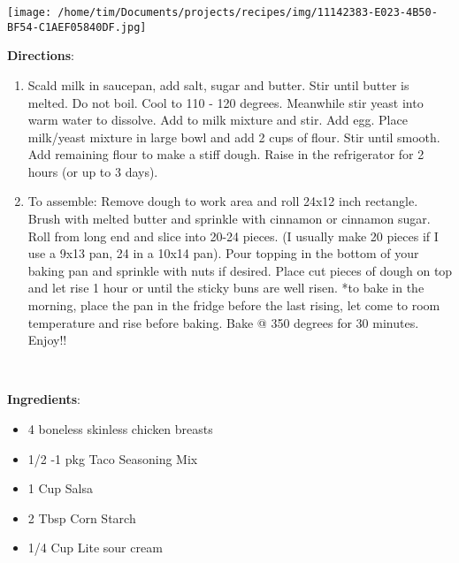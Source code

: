 \documentclass[11pt, twoside, openany]{book}
\begin{document}
\begin{minipage}[t]{0.2\linewidth}
\centering \strut\vspace*{-\baselineskip}\newline
\texttt{[image: /home/tim/Documents/projects/recipes/img/11142383-E023-4B50-BF54-C1AEF05840DF.jpg]}\\
\end{minipage}\vspace{3mm}
\textbf{Directions}:
\vspace{-3mm}\begin{enumerate}\setlength\itemsep{-1mm}
\item Scald milk in saucepan, add salt, sugar and butter. Stir until butter is melted. Do not boil. Cool to 110 - 120 degrees. Meanwhile stir yeast into warm water to dissolve. Add to milk mixture and stir. Add egg. Place milk/yeast mixture in large bowl and add 2 cups of flour. Stir until smooth. Add remaining flour to make a stiff dough. Raise in the refrigerator for 2 hours (or up to 3 days).
\item To assemble:
Remove dough to work area and roll 24x12 inch rectangle. Brush with melted butter and sprinkle with cinnamon or cinnamon sugar. Roll from long end and slice into 20-24 pieces. (I usually make 20 pieces if I use a 9x13 pan, 24 in a 10x14 pan). Pour topping in the bottom of your baking pan and sprinkle with nuts if desired. Place cut pieces of dough on top and let rise 1 hour or until the sticky buns are well risen. *to bake in the morning, place the pan in the fridge before the last rising, let come to room temperature and rise before baking. Bake @ 350 degrees for 30 minutes. Enjoy!!
\end{enumerate}
 \label{crockpot-sour-cream-salsa-chicken}\hfill\textit{}\\
\begin{minipage}[t]{0.8\linewidth}
\textbf{Ingredients}:\vspace{-3mm}
\begin{multicols}{2}
\begin{itemize}\setlength\itemsep{-1mm}
\item 4 boneless skinless chicken breasts
\item 1/2 -1 pkg Taco Seasoning Mix
\item 1 Cup Salsa
\item 2 Tbsp Corn Starch
\item 1/4 Cup Lite sour cream
\end{itemize}
\end{multicols}
\end{minipage}
\end{document}
